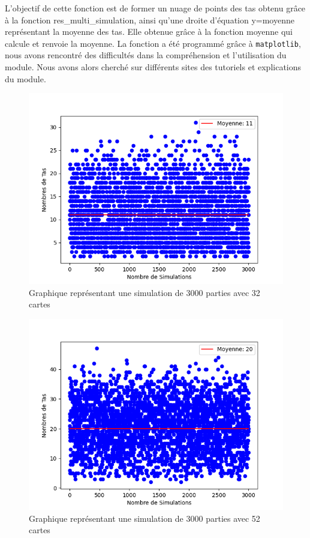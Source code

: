 \documentclass[titlepage]{article}
\begin{document}
L’objectif de cette fonction est de former un nuage de points des tas obtenu grâce à la fonction res\_multi\_simulation, ainsi qu’une droite d’équation y=moyenne représentant la moyenne des tas. Elle obtenue grâce à la fonction moyenne qui calcule et renvoie la moyenne. 
La fonction a été programmé grâce à \texttt{matplotlib}, nous avons rencontré des difficultés dans la compréhension et l’utilisation du module. Nous avons alors cherché sur différents sites des tutoriels et explications du module. \vspace{5mm}

\begin{figure}[h]
    \centering
    \includegraphics[scale=0.5]{stats_3000_32.png}
    \caption{Graphique représentant une simulation de 3000 parties avec 32 cartes}
\end{figure}

\begin{figure}[h]
    \centering
    \includegraphics[scale=0.5]{stats_3000_52.png}
    \caption{Graphique représentant une simulation de 3000 parties avec 52 cartes}
\end{figure}
\end{document}

